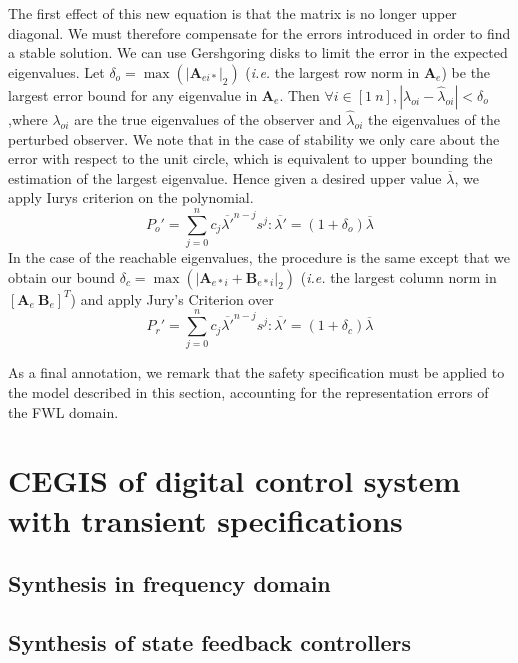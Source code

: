 \documentclass[twocolumn]{autart}    %
\newcommand{\mat}[1]{\boldsymbol{#1}}
\begin{document}
The first effect of this new equation is that the matrix is no longer upper
diagonal.  We must therefore compensate for the errors introduced in order
to find a stable solution.  We can use Gershgoring disks to limit the error
in the expected eigenvalues.  Let $\delta_o=\max(|\mat{A}_{ei*}|_2)$
(\emph{i.e.} the largest row norm in $\mat{A}_e$) be the largest error bound
for any eigenvalue in $\mat{A}_e$.  Then $\forall i \in [1\ n],
|\lambda_{oi}-\hat{\lambda}_{oi}|<\delta_o$,where $\lambda_{oi}$ are the
true eigenvalues of the observer and $\hat{\lambda}_{oi}$ the eigenvalues of
the perturbed observer.  We note that in the case of stability we only care
about the error with respect to the unit circle, which is equivalent to
upper bounding the estimation of the largest eigenvalue.  Hence given a
desired upper value $\overline{\lambda}$, we apply Iurys criterion on the
polynomial.
%
\begin{equation}
P_o'=\sum_{j=0}^n c_j\overline{\lambda'}^{n-j}s^j : \overline{\lambda'}=(1+\delta_o)\overline{\lambda}
\end{equation}
%
In the case of the reachable eigenvalues, the procedure is the same except
that we obtain our bound $\delta_c=\max(|\mat{A}_{e*i}+\mat{B}_{e*i}|_2)$
(\emph{i.e.} the largest column norm in $[\mat{A}_e\ \mat{B}_e]^T$) and
apply Jury's Criterion over
%
\begin{equation}
P_r'=\sum_{j=0}^n c_j\overline{\lambda'}^{n-j}s^j : \overline{\lambda'}=(1+\delta_c)\overline{\lambda}
\end{equation}

As a final annotation, we remark that the safety specification must be
applied to the model described in this section, accounting for the
representation errors of the FWL domain.

\section{CEGIS of digital control system with transient specifications}
\label{sec:method}

\subsection{Synthesis in frequency domain}
\label{ssec:frequencycegis}

\subsection{Synthesis of state feedback controllers}
\label{ssec:sscegis}
\end{document}
